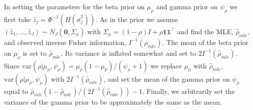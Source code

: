 \documentclass[11pt]{article}
\newcommand{\mb}{\mathbf}
\begin{document}
In setting the parameters for the beta prior on $\mu_{\rho}$ and gamma prior on  $\psi_\rho$ we first take $\hat z_{j}= \Phi^{-1} (H(\hat\sigma_{j}^{2}))$. As in the prior we assume $(\hat z_1,\dots,\hat z_J)\sim N_J(\mathbf{0}, \Sigma_\rho)$ with
$\Sigma_\rho=(1-\rho)I+\rho \mb{1}\mb{1}^{\top}$ and find the MLE, $\hat\rho_{mle}$, and observed inverse Fisher information, $I^{-1}(\rho_{mle})$. The mean of the beta prior on $\mu_{\rho}$ is set to $\hat\rho_{mle}$. Its variance is inflated somewhat and set to $2I^{-1}(\hat\rho_{mle})$. Since $\text{var}(\rho|\mu_{\rho}, \psi_{\rho})=\mu_{\rho} (1-\mu_{p})/(\psi_{\rho}+1)$ we replace $\mu_{\rho}$ with $\hat\rho_{mle}$, $\text{var}(\rho|\mu_{\rho}, \psi_{\rho})$ with $2I^{-1}(\hat\rho_{mle})$, and set the mean of the gamma prior on $\psi_{\rho}$ equal to $\hat\rho_{mle} (1-\hat\rho_{mle})/(2I^{-1}(\hat\rho_{mle}))-1$. Finally, we arbitrarily set the variance of the gamma prior to be approximately the same as the mean.

%




\end{document}
